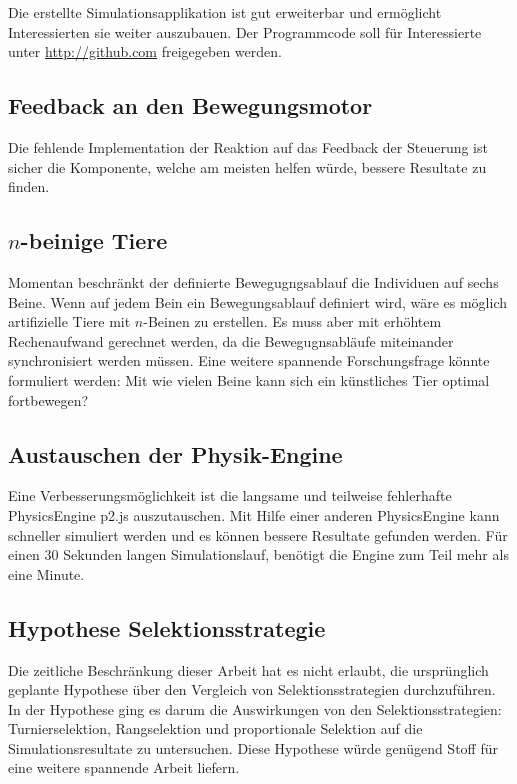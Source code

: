     Die erstellte Simulationsapplikation ist gut erweiterbar und ermöglicht Interessierten sie weiter auszubauen.
    Der Programmcode soll für Interessierte unter \url{http://github.com} freigegeben werden.

    \subsection{Feedback an den Bewegungsmotor\label{sub:PerspectiveFeedback}}

      Die fehlende Implementation der Reaktion auf das Feedback der Steuerung ist sicher die Komponente,
      welche am meisten helfen würde, bessere Resultate zu finden.

    \subsection{\(n\)-beinige Tiere}


      Momentan beschränkt der definierte Bewegugngsablauf die Individuen auf sechs Beine.
      Wenn auf jedem Bein ein Bewegungsablauf definiert wird, wäre es möglich artifizielle Tiere mit \(n\)-Beinen zu erstellen.
      Es muss aber mit erhöhtem Rechenaufwand gerechnet werden, da die Bewegugnsabläufe miteinander synchronisiert werden müssen.
      Eine weitere spannende Forschungsfrage könnte formuliert werden:
      Mit wie vielen Beine kann sich ein künstliches Tier optimal fortbewegen?

    \subsection{Austauschen der Physik-Engine}

      Eine Verbesserungsmöglichkeit ist die langsame und teilweise fehlerhafte \gls{PhysicsEngine} p2.js auszutauschen.
      Mit Hilfe einer anderen \gls{PhysicsEngine} kann schneller simuliert werden und
      es können bessere Resultate gefunden werden.
      Für einen 30 Sekunden langen Simulationslauf, benötigt die Engine zum Teil mehr als eine Minute.

    \subsection{Hypothese Selektionsstrategie\label{sub:hypoSelect}}

      Die zeitliche Beschränkung dieser Arbeit hat es nicht erlaubt,
      die ursprünglich geplante Hypothese über den Vergleich von Selektionsstrategien durchzuführen.
      In der Hypothese ging es darum die Auswirkungen von den Selektionsstrategien:
      Turnierselektion, Rangselektion
      und proportionale Selektion auf die Simulationsresultate zu untersuchen.
      Diese Hypothese würde genügend Stoff für eine weitere spannende Arbeit liefern.

